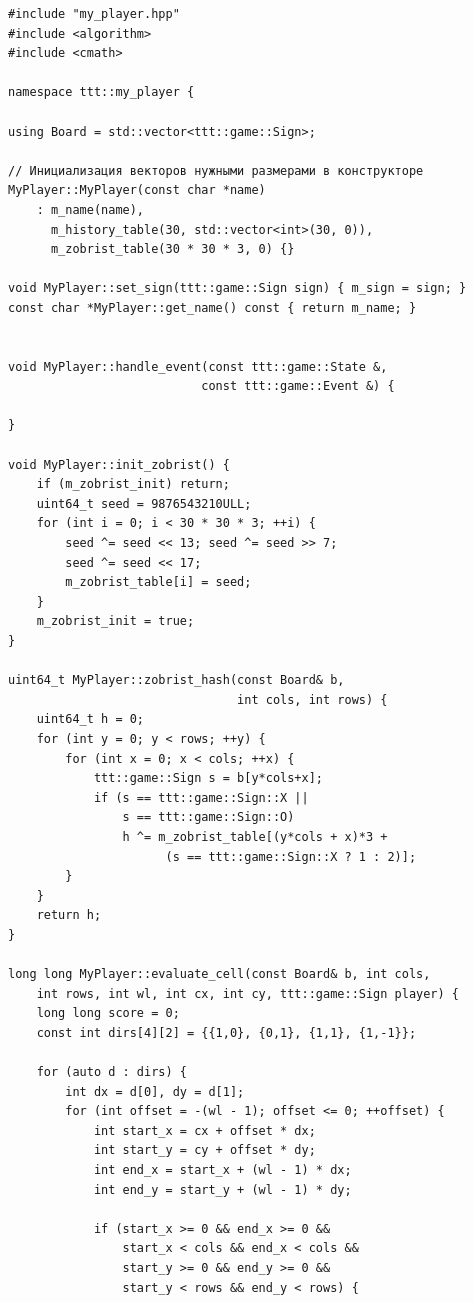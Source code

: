 \documentclass[a4paper,14pt]{extreport}
\begin{document}
\begin{lstlisting}
#include "my_player.hpp"
#include <algorithm>
#include <cmath>

namespace ttt::my_player {

using Board = std::vector<ttt::game::Sign>;

// Инициализация векторов нужными размерами в конструкторе
MyPlayer::MyPlayer(const char *name) 
    : m_name(name), 
      m_history_table(30, std::vector<int>(30, 0)), 
      m_zobrist_table(30 * 30 * 3, 0) {}

void MyPlayer::set_sign(ttt::game::Sign sign) { m_sign = sign; }
const char *MyPlayer::get_name() const { return m_name; }


void MyPlayer::handle_event(const ttt::game::State &, 
                           const ttt::game::Event &) {
    
}

void MyPlayer::init_zobrist() {
    if (m_zobrist_init) return;
    uint64_t seed = 9876543210ULL;
    for (int i = 0; i < 30 * 30 * 3; ++i) {
        seed ^= seed << 13; seed ^= seed >> 7; 
        seed ^= seed << 17;
        m_zobrist_table[i] = seed;
    }
    m_zobrist_init = true;
}

uint64_t MyPlayer::zobrist_hash(const Board& b, 
                                int cols, int rows) {
    uint64_t h = 0;
    for (int y = 0; y < rows; ++y) {
        for (int x = 0; x < cols; ++x) {
            ttt::game::Sign s = b[y*cols+x];
            if (s == ttt::game::Sign::X || 
                s == ttt::game::Sign::O)
                h ^= m_zobrist_table[(y*cols + x)*3 + 
                      (s == ttt::game::Sign::X ? 1 : 2)];
        }
    }
    return h;
}

long long MyPlayer::evaluate_cell(const Board& b, int cols, 
    int rows, int wl, int cx, int cy, ttt::game::Sign player) {
    long long score = 0;
    const int dirs[4][2] = {{1,0}, {0,1}, {1,1}, {1,-1}};
    
    for (auto d : dirs) {
        int dx = d[0], dy = d[1];
        for (int offset = -(wl - 1); offset <= 0; ++offset) {
            int start_x = cx + offset * dx;
            int start_y = cy + offset * dy;
            int end_x = start_x + (wl - 1) * dx;
            int end_y = start_y + (wl - 1) * dy;

            if (start_x >= 0 && end_x >= 0 && 
                start_x < cols && end_x < cols &&
                start_y >= 0 && end_y >= 0 && 
                start_y < rows && end_y < rows) {


\end{lstlisting}
\end{document}
